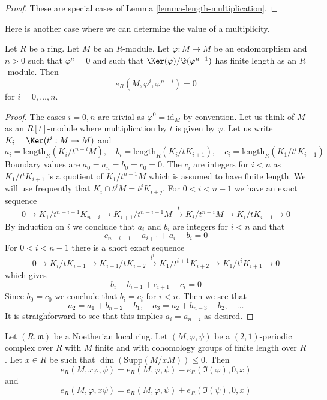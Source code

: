 \begin{proof}
These are special cases of Lemma \ref{lemma-length-multiplication}.
\end{proof}

\noindent
Here is another case where we can determine the value of a multiplicity.

\begin{lemma}
\label{lemma-powers-period-length-zero}
Let $R$ be a ring. Let $M$ be an $R$-module.
Let $\varphi : M \to M$ be an endomorphism and $n > 0$
such that $\varphi^n = 0$ and such that $\Ker(\varphi)/\Im(\varphi^{n - 1})$
has finite length as an $R$-module.
Then
$$
e_R(M, \varphi^i, \varphi^{n - i}) = 0
$$
for $i = 0, \ldots, n$.
\end{lemma}

\begin{proof}
The cases $i = 0, n$ are trivial as $\varphi^0 = \text{id}_M$ by convention.
Let us think of $M$ as an $R[t]$-module where multiplication by $t$
is given by $\varphi$. Let us write
$K_i = \Ker(t^i : M \to M)$ and
$$
a_i = \text{length}_R(K_i/t^{n - i}M),\quad
b_i = \text{length}_R(K_i/tK_{i + 1}),\quad
c_i = \text{length}_R(K_1/t^iK_{i + 1})
$$
Boundary values are $a_0 = a_n = b_0 = c_0 = 0$.
The $c_i$ are integers for $i < n$ as $K_1/t^iK_{i + 1}$
is a quotient of $K_1/t^{n - 1}M$ which is assumed to have finite length.
We will use frequently that $K_i \cap t^jM = t^jK_{i + j}$.
For $0 < i < n - 1$ we have an exact sequence
$$
0 \to
K_1/t^{n - i - 1}K_{n - i} \to
K_{i + 1}/t^{n - i - 1}M \xrightarrow{t} K_i/t^{n - i}M
\to K_i/tK_{i + 1} \to 0
$$
By induction on $i$ we conclude that $a_i$ and $b_i$ are
integers for $i < n$ and that
$$
c_{n - i - 1} - a_{i + 1} + a_i - b_i = 0
$$
For $0 < i < n - 1$ there is a short exact sequence
$$
0 \to
K_i/tK_{i + 1} \to
K_{i + 1}/tK_{i + 2} \xrightarrow{t^i}
K_1/t^{i + 1}K_{i + 2} \to
K_1/t^iK_{i + 1} \to 0
$$
which gives
$$
b_i - b_{i + 1} + c_{i + 1} - c_i = 0
$$
Since $b_0 = c_0$ we conclude that $b_i = c_i$ for $i < n$.
Then we see that
$$
a_2 = a_1 + b_{n - 2} - b_1,\quad
a_3 = a_2 + b_{n - 3} - b_2,\quad \ldots
$$
It is straighforward to see that this implies $a_i = a_{n - i}$ as desired.
\end{proof}

\begin{lemma}
\label{lemma-multiply-period-length}
Let $(R, \mathfrak m)$ be a Noetherian local ring. Let
$(M, \varphi, \psi)$ be a $(2, 1)$-periodic complex over $R$
with $M$ finite and with cohomology groups of finite length over $R$.
Let $x \in R$ be such that $\dim(\text{Supp}(M/xM)) \leq 0$. Then
$$
e_R(M, x\varphi, \psi) = e_R(M, \varphi, \psi) - e_R(\Im(\varphi), 0, x)
$$
and
$$
e_R(M, \varphi, x\psi) = e_R(M, \varphi, \psi) + e_R(\Im(\psi), 0, x)
$$
\end{lemma}

